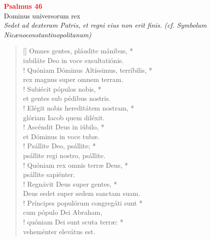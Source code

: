 \vspace{0.6cm}

\def\greinitialformat#1{{\fontsize{40}{40}\selectfont #1}}
\gresetfirstlineaboveinitial{\small \textcolor{red}{ 2. Ant.}}{}
\setaboveinitialseparation{0.72mm}

\vspace{0.3cm}
\begin{center}
 \textcolor{red}{\large \bf Psalmus 46}\\
Dominus universorum rex\\
\textit{\small Sedet ad dexteram Patris, et regni eius non erit finis. (cf. Symbolum Nicænoconstantinopolitanum)}
\end{center}
\begin{verse}[\versewidth]
Omnes gentes, pláudite mánibus, *\\
iubiláte Deo in voce exsultatiónis.\\!
\vin Quóniam Dóminus Altíssimus, terríbilis, *\\
\vin rex magnus super omnem terram.\\!
Subiécit pópulos nobis, *\\
et gentes sub pédibus nostris.\\!
\vin Elégit nobis hereditátem nostram, *\\
\vin glóriam Iacob quem diléxit.\\!
Ascéndit Deus in iúbilo, *\\
et Dóminus in voce tubæ.\\!
\vin Psállite Deo, psállite; *\\
\vin psállite regi nostro, psállite.\\!
Quóniam rex omnis terræ Deus, *\\
psállite sapiénter.\\!
\vin Regnávit Deus super gentes, *\\
\vin Deus sedet super sedem sanctam suam.\\!
Príncipes populórum congregáti sunt *\\
cum pópulo Dei Abraham,\\!
\vin quóniam Dei sunt scuta terræ: *\\
\vin veheménter elevátus est.\\
\end{verse}